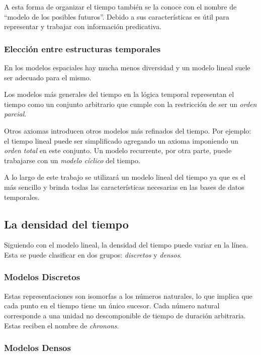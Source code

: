 \documentclass[11pt]{article}
\begin{document}
A esta forma de organizar el tiempo también se la conoce con el nombre de “modelo de los posibles futuros”.
Debido a sus características es útil para representar y trabajar con información predicativa.

\subsubsection{Elección entre estructuras temporales}

En los modelos espaciales hay mucha menos diversidad y un modelo lineal suele ser adecuado para el mismo.

Los modelos más generales del tiempo en la lógica temporal representan el tiempo como un conjunto arbitrario que cumple con la restricción de ser un \textit{orden parcial}. 

Otros axiomas introducen otros modelos más refinados del tiempo. Por ejemplo: el tiempo lineal puede ser simplificado agregando un axioma imponiendo un \textit{orden total} en este conjunto. Un modelo recurrente, por otra parte, puede trabajarse con un \textit{modelo cíclico} del tiempo.

A lo largo de este trabajo se utilizará un modelo lineal del tiempo ya que es el más sencillo y brinda todas las características necesarias en las bases de datos temporales.

\subsection{La densidad del tiempo}

Siguiendo con el modelo lineal, la densidad del tiempo puede variar en la línea. Esta se puede clasificar en dos grupos: \textit{discretos} y \textit{densos}.

\subsubsection{Modelos Discretos}

Estas representaciones son isomorfas a los números naturales, lo que implica que cada punto en el tiempo tiene un único sucesor. Cada número natural corresponde a una unidad no descomponible de tiempo de duración arbitraria. Estas reciben el nombre de \textit{chronons}.  

\subsubsection{Modelos Densos}
\end{document}
